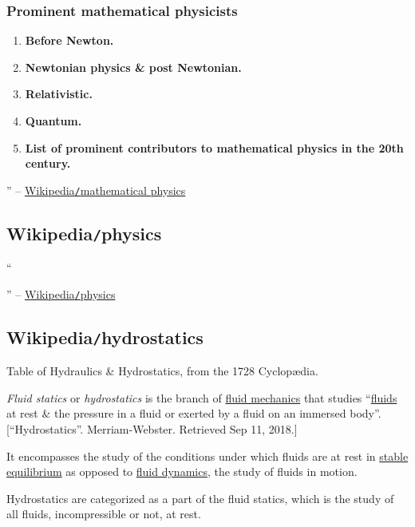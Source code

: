 \documentclass{article}
\begin{document}
\subsubsection{Prominent mathematical physicists}

\begin{enumerate}
	\item {\bf Before Newton.}
	\item {\bf Newtonian physics \& post Newtonian.}
	\item {\bf Relativistic.}
	\item {\bf Quantum.}
	\item {\bf List of prominent contributors to mathematical physics in the 20th century.}
\end{enumerate}
'' -- \href{https://en.wikipedia.org/wiki/Mathematical_physics}{Wikipedia{\tt/}mathematical physics}


\subsection{Wikipedia{\tt/}physics}
``

'' -- \href{https://en.wikipedia.org/wiki/Physics}{Wikipedia{\tt/}physics}


\subsection{Wikipedia{\tt/}hydrostatics}
{\sf Table of Hydraulics \& Hydrostatics, from the 1728 Cyclop\ae dia.}

%
{\it Fluid statics} or {\it hydrostatics} is the branch of \href{https://en.wikipedia.org/wiki/Fluid_mechanics}{fluid mechanics} that studies ``\href{https://en.wikipedia.org/wiki/Fluid}{fluids} at rest \& the pressure in a fluid or exerted by a fluid on an immersed body''.[``Hydrostatics''. Merriam-Webster. Retrieved Sep 11, 2018.]

%
It encompasses the study of the conditions under which fluids are at rest in \href{https://en.wikipedia.org/wiki/Mechanical_equilibrium}{stable equilibrium} as opposed to \href{https://en.wikipedia.org/wiki/Fluid_dynamics}{fluid dynamics}, the study of fluids in motion.

Hydrostatics are categorized as a part of the fluid statics, which is the study of all fluids, incompressible or not, at rest.
\end{document}
